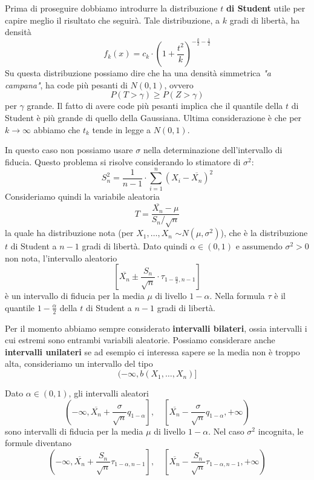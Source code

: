 Prima di proseguire dobbiamo introdurre la distribuzione $t$ \textbf{di Student} utile per capire
meglio il risultato che seguirà. Tale distribuzione, a $k$ gradi di libertà, ha densità
\[
	f_{k} (x) = c_k \cdot
	\left( 1 + \frac{t^2}{k} \right)^{-\frac{k}{2} - \frac{1}{2}}
\]
Su questa distribuzione possiamo dire che ha una densità simmetrica \emph{"a campana"}, ha code
più pesanti di $N(0,1)$, ovvero
\[ P(T > \gamma) \geq P(Z > \gamma) \]
per $\gamma$ grande. Il fatto di avere code più pesanti implica che il quantile della $t$ di
Student è più grande di quello della Gaussiana. Ultima considerazione è che per
$k \to \infty$ abbiamo che $t_k$ tende in legge a $N(0,1)$.

\begin{proposition}
	In questo caso non possiamo usare $\sigma$ nella determinazione dell'intervallo di fiducia.
	Questo problema si risolve considerando lo stimatore di $\sigma^2$:
	\[ S_n^2 = \frac{1}{n-1} \cdot \sum_{i=1}^n \left( X_i - \overline{X_n} \right)^2 \]
	Consideriamo quindi la variabile aleatoria
	\[ T = \frac{\overline{X_n} - \mu}{S_n / \sqrt{n}} \]
	la quale ha distribuzione nota (per $X_1, \dots, X_n$ \iid $\sim N(\mu, \sigma^2)$), che è la
	distribuzione $t$ di Student a $n-1$ gradi di libertà. Dato quindi $\alpha \in (0,1)$ e
	assumendo $\sigma^2 > 0$ non nota, l'intervallo aleatorio
	\[
		\left[ \overline{X_n} \pm
			\frac{S_n}{\sqrt{n}} \cdot \tau_{1 - \frac{\alpha}{2}, n-1} \right]
	\]
	è un intervallo di fiducia per la media $\mu$ di livello $1-\alpha$. Nella formula $\tau$ è il
	quantile $1-\frac{\alpha}{2}$ della $t$ di Student a $n-1$ gradi di libertà.
\end{proposition}

Per il momento abbiamo sempre considerato \textbf{intervalli bilateri}, ossia intervalli i cui
estremi sono entrambi variabili aleatorie. Possiamo considerare anche \textbf{intervalli unilateri}
se ad esempio ci interessa sapere se la media non è troppo alta, consideriamo un intervallo del
tipo
\[ (-\infty, b(X_1, \dots, X_n)] \]

\begin{proposition}
	Dato $\alpha \in (0,1)$, gli intervalli aleatori
	\[
		\left( -\infty, \overline{X_n} + \frac{\sigma}{\sqrt{n}} q_{1-\alpha} \right],
		\quad
		\left[ \overline{X_n} - \frac{\sigma}{\sqrt{n}} q_{1-\alpha}, +\infty \right)
	\]
	sono intervalli di fiducia per la media $\mu$ di livello $1-\alpha$. Nel caso $\sigma^2$
	incognita, le formule diventano
	\[
		\left( -\infty, \overline{X_n} + \frac{S_n}{\sqrt{n}} \tau_{1-\alpha, n-1} \right],
		\quad
		\left[ \overline{X_n} - \frac{S_n}{\sqrt{n}} \tau_{1-\alpha, n-1}, +\infty \right)
	\]
\end{proposition}